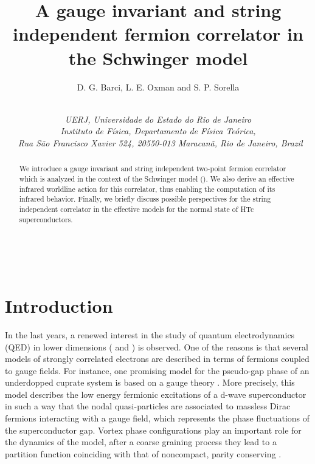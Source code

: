 \documentclass[a4paper,12pt]{article}
\begin{document}
\title{\textbf{A gauge invariant and string independent fermion correlator in 
the Schwinger model}}
\author{D. G. Barci, L. E. Oxman and S. P. Sorella \and \myHighlight{$\;$}\coordHE{}\vspace{4mm}\textbf{\ } \\
{\small {\textit{UERJ, Universidade do Estado do Rio de Janeiro}}} \\
{\small {\textit{Instituto de F\'{i}sica, Departamento de F\'{i}sica
Te\'{o}rica,}}} \\
{\small {\textit{\ Rua S\~{a}o Francisco Xavier 524, 20550-013 Maracan\~{a},
Rio de Janeiro, Brazil}}}\vspace{2mm}}
\maketitle

\begin{abstract}
We introduce a gauge invariant and string independent two-point fermion correlator 
which is analyzed in the context of the Schwinger model (\coordHE{}). We also derive an effective infrared worldline action for this correlator, thus enabling the computation of its infrared behavior. Finally, we briefly discuss possible perspectives for the string independent correlator in the \coordHE{} effective models for the normal state of HTc superconductors.
\end{abstract}

\vfill\newpage\ \makeatother

\renewcommand{\theequation}{\thesection.\arabic{equation}}

\section{Introduction}

In the last years, a renewed interest in the study of quantum electrodynamics 
(QED) in lower dimensions (\coordHE{} and \coordHE{}) is observed. One of the reasons is that 
several models of strongly correlated electrons are described in terms of fermions 
coupled to gauge fields. For instance, one promising model for the pseudo-gap phase 
of an underdopped cuprate system is based on a \coordHE{} gauge theory \cite{rw1,yft}. More precisely, 
this model describes the low energy fermionic excitations of a d-wave superconductor in 
such a way that the nodal quasi-particles are associated to massless Dirac fermions 
interacting with a gauge field, which represents the phase fluctuations of the superconductor 
gap. Vortex phase configurations play an important role for the dynamics of the model, after a coarse graining process they lead to a partition function coinciding with that of noncompact, parity conserving \coordHE{} \cite{ftv1}.
\end{document}
